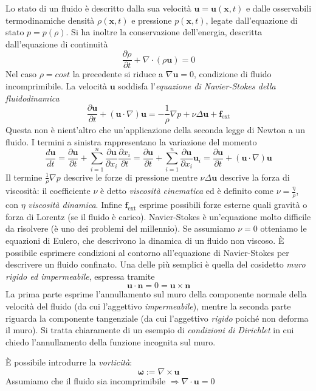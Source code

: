 \documentclass[a4paper,11pt]{report}
\newcommand{\vect}[1]{\boldsymbol{#1}}
\newcommand{\x}{\boldsymbol{x}}
\begin{document}
Lo stato di un fluido \`e descritto dalla sua velocit\`a $\vect{u}=\vect{u}(\x,t)$ e dalle osservabili termodinamiche densit\`a $\rho(\x, t)$ e pressione $p(\x,t)$, legate dall'equazione di stato $p=p(\rho)$.
Si ha inoltre la conservazione dell'energia, descritta dall'equazione di continuit\`a
\[
\frac{\partial \rho}{\partial t}+\nabla \cdot (\rho \vect{u})=0
\]
Nel caso $\rho=cost$ la precedente si riduce a $\nabla \vect{u}=0$, condizione di fluido incomprimibile.
La velocit\`a $\vect{u}$ soddisfa l'\emph{equazione di Navier-Stokes della fluidodinamica}
\[
\frac{\partial \vect{u}}{\partial t}+(\vect{u}\cdot \nabla) \vect{u}=-\frac{1}{\rho}\nabla p + \nu \Delta \vect{u} + \vect{f}_\text{ext}
\]
Questa non \`e nient'altro che un'applicazione della seconda legge di Newton a un fluido.
I termini a sinistra rappresentano la variazione del momento
\[
\frac{d \vect{u}}{d t} = \frac{\partial \vect{u}}{\partial t} + \sum_{i=1}^n \frac{\partial \vect{u}}{\partial x_i} \frac{\partial x_i}{\partial t} = \frac{\partial \vect{u}}{\partial t} + \sum_{i=1}^n \frac{\partial \vect{u}}{\partial x_i} \vect{u}_i=\frac{\partial \vect{u}}{\partial t}+(\vect{u}\cdot \nabla) \vect{u}
\]
Il termine $\frac{1}{\rho}\nabla p$ descrive le forze di pressione mentre $\nu \Delta \vect{u}$ descrive la forza di viscosit\`a:
il coefficiente $\nu$ \`e detto \emph{viscosit\`a cinematica} ed \`e definito come $\nu=\frac{\eta}{\rho}$, con $\eta$ \emph{viscosit\`a dinamica}.
Infine $\vect{f}_\text{ext}$ esprime possibili forze esterne quali gravit\`a o forza di Lorentz (se il fluido \`e carico).
Navier-Stokes \`e un'equazione molto difficile da risolvere (\`e uno dei problemi del millennio).
Se assumiamo $\nu=0$ otteniamo le equazioni di Eulero, che descrivono la dinamica di un fluido non viscoso.
\`E possibile esprimere condizioni al contorno all'equazione di Navier-Stokes per descrivere un fluido confinato.
Una delle pi\`u semplici \`e quella del cosidetto \emph{muro rigido ed impermeabile}, espressa tramite
\[
\vect{u}\cdot \vect{n}=0=\vect{u}\times \vect{n}
\]
La prima parte esprime l'annullamento sul muro della componente normale della velocit\`a del fluido (da cui l'aggettivo \emph{impermeabile}), mentre la seconda parte riguarda la componente tangenziale (da cui l'aggettivo \emph{rigido} poich\'e non deforma il muro).
Si tratta chiaramente di un esempio di \emph{condizioni di Dirichlet} in cui chiedo l'annullamento della funzione incognita sul muro.

\medskip

\`E possibile introdurre la \emph{vorticit\`a}:
\[
\vect{\omega}:=\nabla \times \vect{u}
\]
Assumiamo che il fluido sia incomprimibile $\Rightarrow \nabla \cdot \vect{u}=0$
\end{document}
